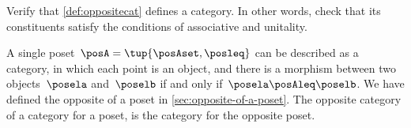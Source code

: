 \vfill
\begin{gradedexercise}
    \label{ex:OppositeCat}
    Verify that \cref{def:oppositecat} defines a category.
    In other words, check that its constituents satisfy the conditions of associative and unitality.
\end{gradedexercise}


\begin{example}
    A single poset~$\posA=\tup{\posAset, \posleq}$ can be described as a category, in which each point is an object, and there is a morphism between two objects~$\posela$ and~$\poselb$ if and only if~$\posela \posAleq \poselb$.
    We have defined the opposite of a poset in \cref{sec:opposite-of-a-poset}.
    The opposite category of a category for a poset, is the category for the opposite poset.
\end{example}
